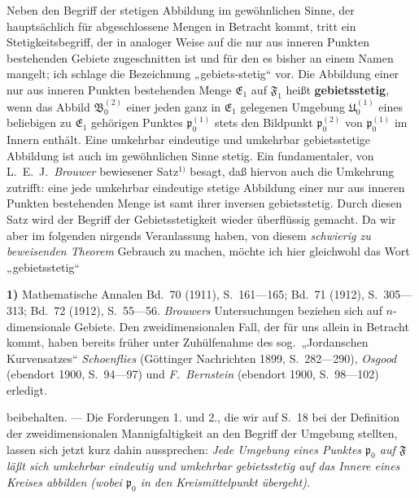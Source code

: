 \documentclass{article}
\begin{document}
Neben den Begriff der stetigen Abbildung im gewöhnlichen Sinne, der hauptsächlich für abgeschlossene Mengen in Betracht kommt, tritt ein Stetigkeitsbegriff, der in analoger Weise auf die nur aus inneren Punkten bestehenden Gebiete zugeschnitten ist und für den es bisher an einem Namen mangelt; ich schlage die Bezeichnung „gebiets-stetig“ vor. Die Abbildung einer nur aus inneren Punkten bestehenden Menge $\mathfrak{E}_1$ auf $\mathfrak{F}_1$ heißt \textbf{gebietsstetig}, wenn das Abbild $\mathfrak{B}_0^{(2)}$ einer jeden ganz in $\mathfrak{E}_1$ gelegenen Umgebung $\mathfrak{U}_0^{(1)}$ eines beliebigen zu $\mathfrak{E}_1$ gehörigen Punktes $\mathfrak{p}_0^{(1)}$ stets den Bildpunkt $\mathfrak{p}_0^{(2)}$ von $\mathfrak{p}_0^{(1)}$ im Innern enthält. Eine umkehrbar eindeutige und umkehrbar gebietsstetige Abbildung ist auch im gewöhnlichen Sinne stetig. Ein fundamentaler, von L.\ E.\ J.\ \emph{Brouwer} bewiesener Satz${}^{1)}$ besagt, daß hiervon auch die Umkehrung zutrifft: eine jede umkehrbar eindeutige stetige Abbildung einer nur aus inneren Punkten bestehenden Menge ist samt ihrer inversen gebietsstetig. Durch diesen Satz wird der Begriff der Gebietsstetigkeit wieder überflüssig gemacht. Da wir aber im folgenden nirgends Veranlassung haben, von diesem \emph{schwierig zu beweisenden Theorem} Gebrauch zu machen, möchte ich hier gleichwohl das Wort „gebietsstetig“

\textbf{1)} Mathematische Annalen Bd.\ 70 (1911), S.\ 161---165; Bd.\ 71 (1912), S.\ 305---313; Bd.\ 72 (1912), S.\ 55---56. \emph{Brouwers} Untersuchungen beziehen sich auf $n$-dimensionale Gebiete. Den zweidimensionalen Fall, der für uns allein in Betracht kommt, haben bereits früher unter Zuhülfenahme des sog.\ „Jordanschen Kurvensatzes“ \emph{Schoenflies} (Göttinger Nachrichten 1899, S.\ 282---290), \emph{Osgood} (ebendort 1900, S.\ 94---97) und \emph{F.~Bernstein} (ebendort 1900, S.\ 98---102) erledigt.

beibehalten. --- Die Forderungen 1. und 2., die wir auf S.\ 18 bei der Definition der zweidimensionalen Mannigfaltigkeit an den Begriff der Umgebung stellten, lassen sich jetzt kurz dahin aussprechen: \emph{Jede Umgebung eines Punktes $\mathfrak{p}_0$ auf $\mathfrak{F}$ läßt sich umkehrbar eindeutig und umkehrbar gebietsstetig auf das Innere eines Kreises abbilden (wobei $\mathfrak{p}_0$ in den Kreismittelpunkt übergeht).}
\end{document}
